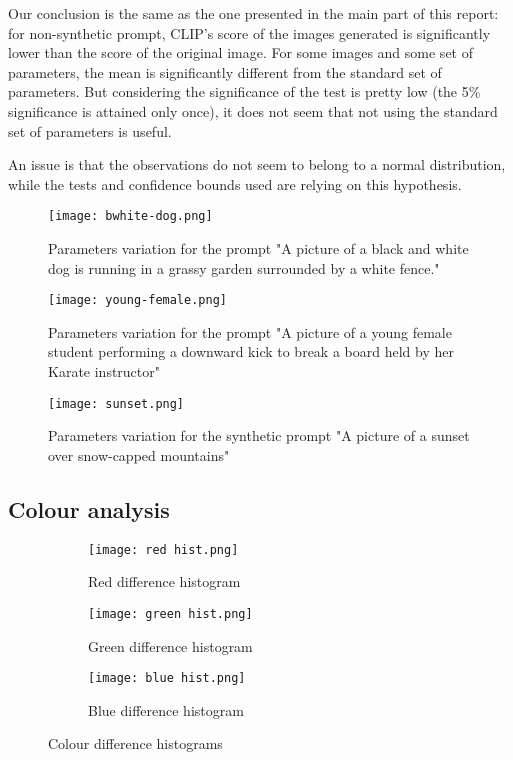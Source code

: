 \documentclass{article}
\begin{document}
\begin{appendix}
Our conclusion is the same as the one presented in the main part of this report: for non-synthetic prompt, CLIP's score of the images generated is significantly lower than the score of the original image. For some images and some set of parameters, the mean is significantly different from the standard set of parameters. But considering the significance of the test is pretty low (the 5\% significance is attained only once), it does not seem that not using the standard set of parameters is useful. 

An issue is that the observations do not seem to belong to a normal distribution, while the tests and confidence bounds used are relying on this hypothesis. 

\begin{figure}[H]
    \centering
    \texttt{[image: bwhite-dog.png]}
    \caption{Parameters variation for the prompt "A picture of a black and white dog is running in a grassy garden surrounded by a white fence."}
    \label{fig:gen-bwhite-dog}
\end{figure}

\begin{figure}[H]
    \centering
    \texttt{[image: young-female.png]}
    \caption{Parameters variation for the prompt "A picture of a young female student performing a downward kick to break a board held by her Karate instructor"}
    \label{fig:gen-young-female}
\end{figure}

\begin{figure}[H]
    \centering
    \texttt{[image: sunset.png]}
    \caption{Parameters variation for the synthetic prompt "A picture of a 
    sunset over snow-capped mountains"}
    \label{fig:gen-sunset}
\end{figure}


\subsection{Colour analysis}

\label{app:apcolan}

\begin{figure}[H]
\begin{subfigure}{.5\textwidth}
  \centering
  \texttt{[image: red hist.png]}
  \caption{Red difference histogram}
  \label{fig:red_hist}
\end{subfigure}%
\begin{subfigure}{.5\textwidth}
  \centering
  \texttt{[image: green hist.png]}
  \caption{Green difference histogram}
  \label{fig:green_hist}
\end{subfigure}
\begin{subfigure}{.5\textwidth}
  \centering
  \texttt{[image: blue hist.png]}
  \caption{Blue difference histogram}
  \label{fig:blue_hist}
\end{subfigure}
\caption{Colour difference histograms}
\label{fig:histograms}
\end{figure}


\end{appendix}
\end{document}
